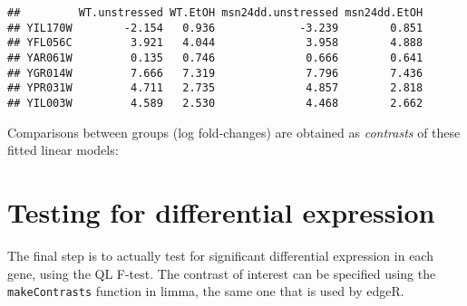 \documentclass[
]{book}
\newenvironment{Shaded}{\begin{snugshade}}{\end{snugshade}}
\newcommand{\CommentTok}[1]{\textcolor[rgb]{0.56,0.35,0.01}{\textit{#1}}}
\begin{document}
\begin{verbatim}
##         WT.unstressed WT.EtOH msn24dd.unstressed msn24dd.EtOH
## YIL170W        -2.154   0.936             -3.239        0.851
## YFL056C         3.921   4.044              3.958        4.888
## YAR061W         0.135   0.746              0.666        0.641
## YGR014W         7.666   7.319              7.796        7.436
## YPR031W         4.711   2.735              4.857        2.818
## YIL003W         4.589   2.530              4.468        2.662
\end{verbatim}

\begin{Shaded}
\end{Shaded}

Comparisons between groups (log fold-changes) are obtained as
\emph{contrasts} of these fitted linear models:

\hypertarget{testing-for-differential-expression-2}{%
\section{Testing for differential expression}\label{testing-for-differential-expression-2}}

The final step is to actually test for significant differential
expression in each gene, using the QL F-test. The contrast of interest
can be specified using the \texttt{makeContrasts} function in limma, the same
one that is used by edgeR.
\end{document}
